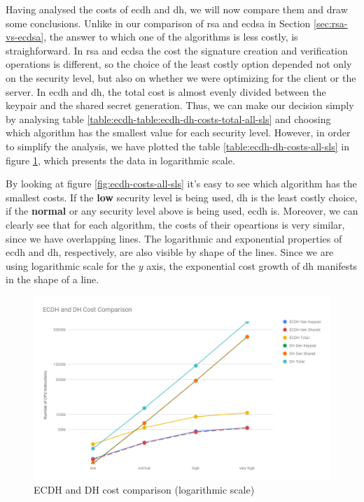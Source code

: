 \documentclass{llncs}
\begin{document}
Having analysed the costs of \gls{ecdh} and \gls{dh}, we will now compare them and draw some conclusions. Unlike in our comparison of
\gls{rsa} and \gls{ecdsa} in Section \ref{sec:rsa-vs-ecdsa}, the answer to which one of the algorithms is less costly, is straighforward.
In \gls{rsa} and \gls{ecdsa} the cost the signature creation and verification operations is different, so the choice of the least costly
option depended not only on the security level, but also on whether we were optimizing for the client or the server. In \gls{ecdh} and \gls{dh},
the total cost is almost evenly divided between the keypair and the shared secret generation. Thus, we can make our decision simply
by analysing table \ref{table:ecdh-table:ecdh-dh-costs-total-all-sls} and choosing which algorithm has the smallest value for each security level.
However, in order to simplify the analysis, we have plotted the table \ref{table:ecdh-dh-costs-all-sls} in figure \ref{fig:ecdh-dh-costs-all}, which
presents the data in logarithmic scale.

By looking at figure \ref{fig:ecdh-costs-all-sls} it's easy to see which algorithm has the smallest costs. If the \textbf{low} security level is being used, 
\gls{dh} is the least costly choice, if the \textbf{normal} or any security level above is being used, \gls{ecdh} is. Moreover, we can clearly see that
for each algorithm, the costs of their opeartions is very similar, since we have overlapping lines. The logarithmic and exponential properties of
\gls{ecdh} and \gls{dh}, respectively, are also visible by shape of the lines. Since we are using logarithmic scale for the $y$ axis, the
exponential cost growth of \gls{dh} manifests in the shape of a line.

\begin{figure}
  \centering
  \includegraphics[width=1.0\textwidth]{img/ecdh_dh_costs_all.png}
  \centering \caption{\label{fig:ecdh-dh-costs-all} ECDH and DH cost comparison (logarithmic scale)}
\end{figure}
\end{document}
